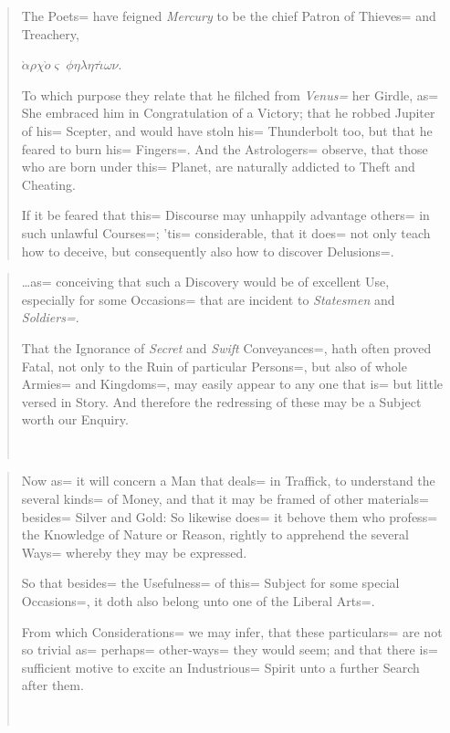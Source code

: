 \documentclass[a4paper]{article}
\begin{document}
\medskip
\begin{quote}
	{\selectfont The Poets= have feigned
	\emph{Mercury} to be the chief Patron of Thieves= and Treachery,}
	\begin{center}
		$\grave{\alpha}\rho\chi\grave{o}\varsigma\;\phi\eta\lambda\eta\tau\acute{\iota}\omega\nu$.
	\end{center}
	{\selectfont To which purpose they relate that
	he filched from \emph{Venus=} her Girdle, as= She embraced him
	in Congratulation of a Victory; that he robbed Jupiter of his=
	Scepter, and would have stoln his= Thunderbolt too, but that he
	feared to burn his= Fingers=. And the Astrologers= observe, that
	those who are born under this= Planet, are naturally addicted to
	Theft and Cheating.}

	{\selectfont If it be feared that this=
	Discourse may unhappily advantage others= in such unlawful
	Courses=; 'tis= considerable, that it does= not only teach
	how to deceive, but consequently also how to discover
	Delusions=.}~\cite[p.~90]{Wilkins1641}
\end{quote}

\medskip
\begin{quote}
	{\selectfont \ldots as= conceiving that such
	a Discovery would be of excellent Use, especially for some
	Occasions= that are incident to \emph{Statesmen} and \emph{Soldiers=}.
	
	That the Ignorance of \emph{Secret} and \emph{Swift} Conveyances=,
	hath often proved Fatal, not only to the Ruin of particular
	Persons=, but also of whole Armies= and Kingdoms=, may easily
	appear to any one that is= but little versed in Story.  And
	therefore the redressing of these may be a Subject worth our
	Enquiry.}~\cite[p.~5]{Wilkins1641}
\end{quote}

\medskip
\begin{quote}
	{\selectfont Now as= it will concern a Man
	that deals= in Traffick, to understand
	the several kinds= of Money, and that it may be framed of other
	materials= besides= Silver and Gold: So likewise does= it behove
	them who profess= the Knowledge of Nature or Reason, rightly to
	apprehend the several Ways= whereby they may be expressed.

	So that besides= the Usefulness= of this= Subject for some special
	Occasions=, it doth also belong unto one of the Liberal Arts=.

	From which Considerations= we may infer, that these particulars=
	are not so trivial as= perhaps= other-ways= they would seem; and
	that there is= sufficient motive to excite an Industrious= Spirit
	unto a further Search after them.}~\cite[p.~6]{Wilkins1641}
\end{quote}
\end{document}
